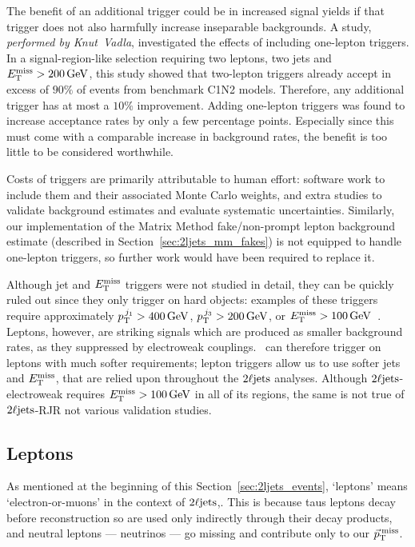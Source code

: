 The benefit of an additional trigger could be in increased signal yields if
that trigger does not also harmfully increase inseparable backgrounds.
A study, \emph{performed by Knut~Vadla}, investigated the effects
of including one-lepton triggers.
In a signal-region-like selection requiring two leptons, two jets and
$\met > 200\,\eV[G]$, this study showed that two-lepton triggers already accept
in excess of $90\%$ of events from benchmark C1N2 models.
Therefore, any additional trigger has at most a $10\%$ improvement.
Adding one-lepton triggers was found to increase acceptance rates by only a
few percentage points.
Especially since this must come with a comparable increase in background rates,
the benefit is too little to be considered worthwhile.

Costs of triggers are primarily attributable to human effort:
software work to include them and their associated Monte Carlo weights, and
extra studies to validate background estimates and evaluate systematic
uncertainties.
Similarly, our implementation of the Matrix Method fake/non-prompt lepton
background estimate (described in Section~\ref{sec:2ljets_mm_fakes}) is not
equipped to handle one-lepton triggers, so further work would have been
required to replace it.

Although jet and $\met$ triggers were not studied in detail, they can be
quickly ruled out since they only trigger on hard objects:
examples of these triggers require
approximately $\ptjone > 400\,\eV[G]$, $p_\mathrm{T}^{\,j_3} > 200\,\eV[G]$, or
$\met > 100\,\eV[G]$~\cite{atlas_twiki_lowest_unprescaled}.
Leptons, however, are striking signals which are produced as smaller background
rates, as they suppressed by electroweak couplings.
\atlas\ can therefore trigger on leptons with much softer requirements;
lepton triggers allow us to use softer jets and $\met$, that are relied upon
throughout the $\twoljets$ analyses.
Although $\twoljets$-electroweak requires $\met > 100\,\eV[G]$ in all of its
regions, the same is not true of $\twoljets$-RJR not various validation
studies.


\subsection{Leptons}
\label{sec:2ljets_events_leptons}
As mentioned at the beginning of this Section~\ref{sec:2ljets_events},
`leptons' means `electron-or-muons' in the context of $\twoljets$,.
This is because taus leptons decay before reconstruction so are used only
indirectly through their decay products, and neutral leptons
--- neutrinos --- go missing and contribute only to our $\ptmiss$.

